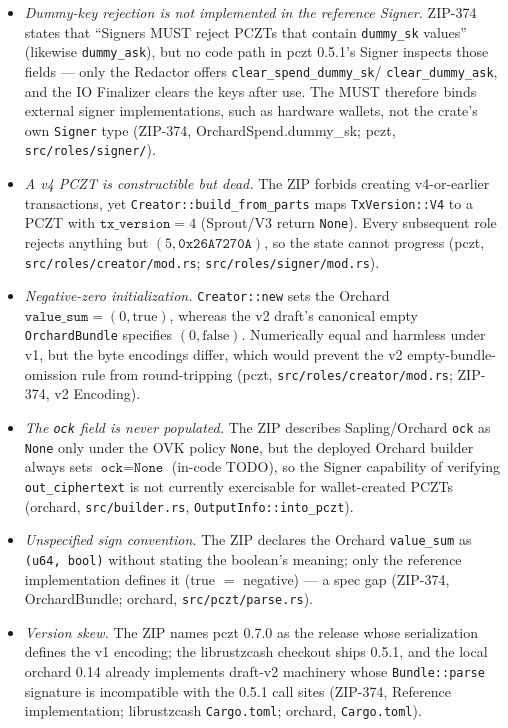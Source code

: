 \documentclass[11pt,a4paper]{article}
\theoremstyle{definition}
\begin{document}
\begin{itemize}
\item \emph{Dummy-key rejection is not implemented in the reference
  Signer.} ZIP-374 states that ``Signers MUST reject PCZTs that contain
  \texttt{dummy\_sk} values'' (likewise \texttt{dummy\_ask}), but no code
  path in \textsf{pczt} 0.5.1's Signer inspects those fields --- only the
  Redactor offers \texttt{clear\_spend\_dummy\_sk}/%
  \texttt{clear\_dummy\_ask}, and the IO Finalizer clears the keys after
  use. The MUST therefore binds external signer implementations, such as
  hardware wallets, not the crate's own \texttt{Signer} type (ZIP-374,
  OrchardSpend.dummy\_sk; \textsf{pczt}, \texttt{src/roles/signer/}).
\item \emph{A v4 PCZT is constructible but dead.} The ZIP forbids
  creating v4-or-earlier transactions, yet
  \texttt{Creator::build\_from\_parts} maps \texttt{TxVersion::V4} to a
  PCZT with $\texttt{tx\_version} = 4$ (Sprout/V3 return \texttt{None}).
  Every subsequent role rejects anything but $(5, \mathtt{0x26A7270A})$,
  so the state cannot progress (\textsf{pczt},
  \texttt{src/roles/creator/mod.rs};
  \texttt{src/roles/signer/mod.rs}).
\item \emph{Negative-zero initialization.} \texttt{Creator::new} sets the
  Orchard $\texttt{value\_sum} = (0, \mathrm{true})$, whereas the v2
  draft's canonical empty \texttt{OrchardBundle} specifies
  $(0, \mathrm{false})$. Numerically equal and harmless under v1, but
  the byte encodings differ, which would prevent the v2
  empty-bundle-omission rule from round-tripping (\textsf{pczt},
  \texttt{src/roles/creator/mod.rs}; ZIP-374, v2 Encoding).
\item \emph{The \texttt{ock} field is never populated.} The ZIP describes
  Sapling/Orchard \texttt{ock} as \texttt{None} only under the OVK policy
  \texttt{None}, but the deployed Orchard builder always sets
  $\texttt{ock} = \texttt{None}$ (in-code TODO), so the Signer capability
  of verifying \texttt{out\_ciphertext} is not currently exercisable for
  wallet-created PCZTs (\textsf{orchard}, \texttt{src/builder.rs},
  \texttt{OutputInfo::into\_pczt}).
\item \emph{Unspecified sign convention.} The ZIP declares the Orchard
  \texttt{value\_sum} as \texttt{(u64, bool)} without stating the
  boolean's meaning; only the reference implementation defines it (true
  $=$ negative) --- a spec gap (ZIP-374, OrchardBundle;
  \textsf{orchard}, \texttt{src/pczt/parse.rs}).
\item \emph{Version skew.} The ZIP names \textsf{pczt} 0.7.0 as the
  release whose serialization defines the v1 encoding; the librustzcash
  checkout ships 0.5.1, and the local \textsf{orchard} 0.14 already
  implements draft-v2 machinery whose \texttt{Bundle::parse} signature is
  incompatible with the 0.5.1 call sites (ZIP-374, Reference
  implementation; librustzcash \texttt{Cargo.toml};
  \textsf{orchard}, \texttt{Cargo.toml}).
\end{itemize}
\end{document}
